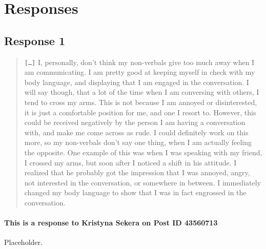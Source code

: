 
\section{Responses}
  \subsection{Response 1}
    \begin{quotation}
      \texttt{[\ldots]}
      I, personally, don’t think my non-verbals give too much away when I am
        communicating. I am pretty good at keeping myself in check with my body
        language, and displaying that I am engaged in the conversation. I will
        say though, that a lot of the time when I am conversing with others, I
        tend to cross my arms. This is not because I am annoyed or
        disinterested, it is just a comfortable position for me, and one I
        resort to. However, this could be received negatively by the person I
        am having a conversation with, and make me come across as rude. I could
        definitely work on this more, so my non-verbals don’t say one thing,
        when I am actually feeling the opposite. One example of this was when I
        was speaking with my friend, I crossed my arms, but soon after I noticed
        a shift in his attitude. I realized that he probably got the impression
        that I was annoyed, angry, not interested in the conversation, or
        somewhere in between. I immediately changed my body language to show
        that I was in fact engrossed in the conversation.
    \end{quotation}

    \paragraph{This is a response to Kristyna Sekera on Post ID 43560713}
      Placeholder.
